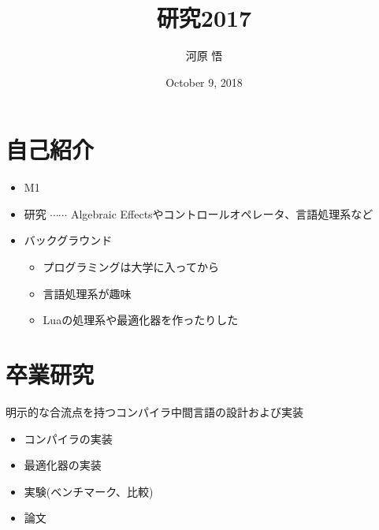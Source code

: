 \documentclass[unicode,compress,14pt,CJK%
\directlua{
    handout = os.getenv"HANDOUT"
    local _ = handout and tex.print(",handout")
},t]{beamer}
\title{研究2017}
\author{河原 悟}
\institute{研究室紹介 2018}
\date{October 9, 2018}
\begin{document}
\maketitle

\notoc

\switchfooter
\switchheader
\begin{frame}[c]
    \begin{toccol}
        \tableofcontents
    \end{toccol}
\end{frame}
\switchfooter
\switchheader

\section{自己紹介}
\begin{frame}
    \frametitlesec

    \begin{itemize}
        \item M1
        \item 研究 $\cdots\cdots$ Algebraic Effectsやコントロールオペレータ、言語処理系など
        \item バックグラウンド

            \begin{itemize}
                \item プログラミングは大学に入ってから
                \item 言語処理系が趣味
                \item Luaの処理系や最適化器を作ったりした
            \end{itemize}
    \end{itemize}
\end{frame}

\section{卒業研究}
\begin{frame}
    \frametitlesec

    明示的な合流点を持つコンパイラ中間言語の設計および実装

    \begin{itemize}
        \item コンパイラの実装
        \item 最適化器の実装
        \item 実験(ベンチマーク、比較)
        \item 論文
    \end{itemize}
\end{frame}
\end{document}
